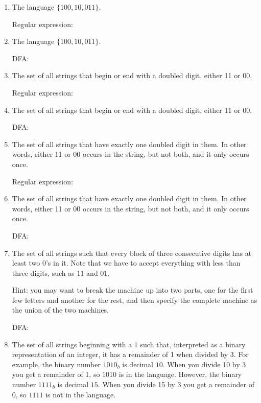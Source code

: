 \documentclass{article}
\begin{document}
\begin{enumerate}
\item
  \label{langfirst}
  The language $\{100, 10, 011\}$.

  Regular expression: 

\item   The language $\{100, 10, 011\}$.

  DFA:
    

\item The set of 
  all strings that begin or end with a doubled digit, either 11 or 00.

  Regular expression:

  
\item The set of 
  all strings that begin or end with a doubled digit, either 11 or 00.

  DFA:

  
\item
The set of all strings that have exactly one doubled digit in them.
  In other words, either 11 or 00 occurs in the string, but not both,
  and it only occurs once.

  Regular expression:
  

\item
The set of all strings that have exactly one doubled digit in them.
  In other words, either 11 or 00 occurs in the string, but not both,
  and it only occurs once.

DFA:


\item The set of all strings such that every block of three consecutive
  digits has at least two 0's in it.  Note that we have to accept
  everything with less than three digits, such as 11 and 01.

  Hint:  you may want to break the machine up into two parts, one for
  the first few letters and another for the rest, and then specify the
  complete machine as the union of the two machines.

  DFA:


\item \label{langlast} The set of all strings beginning with a 1 such
  that, interpreted as a binary representation of an integer, it has a
  remainder of 1 when divided by 3.  For example, the binary number
  $1010_b$ is decimal $10$.  When you divide 10 by 3 you get a
  remainder of 1, so $1010$ is in the language.  However, the binary
  number $1111_b$ is decimal $15$.  When you divide 15 by 3 you get a
  remainder of 0, so $1111$ is not in the language.


\end{enumerate}
\end{document}
